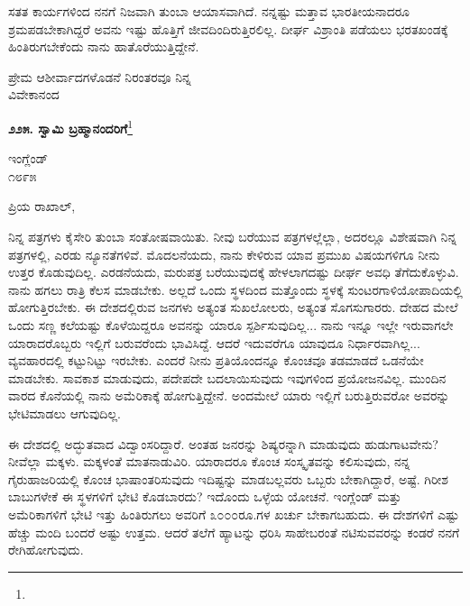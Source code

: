 \eject

ಸತತ ಕಾರ್ಯಗಳಿಂದ ನನಗೆ ನಿಜವಾಗಿ ತುಂಬಾ ಆಯಾಸವಾಗಿದೆ. ನನ್ನಷ್ಟು ಮತ್ತಾವ ಭಾರತೀಯನಾದರೂ ಶ್ರಮಪಡಬೇಕಾಗಿದ್ದರೆ ಅವನು ಇಷ್ಟು ಹೊತ್ತಿಗೆ ಜೀವದಿಂದಿರುತ್ತಿರಲಿಲ್ಲ. ದೀರ್ಘ ವಿಶ್ರಾಂತಿ ಪಡೆಯಲು ಭರತಖಂಡಕ್ಕೆ ಹಿಂತಿರುಗಬೇಕೆಂದು ನಾನು ಹಾತೊರೆಯುತ್ತಿದ್ದೇನೆ.


\vspace{-0.3cm}

{\flushright
ಪ್ರೇಮ ಆಶೀರ್ವಾದಗಳೊಡನೆ ನಿರಂತರವೂ ನಿನ್ನ\\ವಿವೇಕಾನಂದ\par}

\begin{center}
\textbf{೨೨೫. ಸ್ವಾಮಿ ಬ್ರಹ್ಮಾನಂದರಿಗೆ}\footnote{}
\end{center}

\vspace{-0.3cm}

\begin{flushright}
ಇಂಗ್ಲೆಂಡ್\\೧೮೯೫
\end{flushright}

\vspace{-0.2cm}

\vspace{0.1cm}

\noindent
ಪ್ರಿಯ ರಾಖಾಲ್,

\vspace{0.18cm}

ನಿನ್ನ ಪತ್ರಗಳು ಕೈಸೇರಿ ತುಂಬಾ ಸಂತೋಷವಾಯಿತು. ನೀವು ಬರೆಯುವ ಪತ್ರಗಳಲ್ಲೆಲ್ಲಾ, ಅದರಲ್ಲೂ ವಿಶೇಷವಾಗಿ ನಿನ್ನ ಪತ್ರಗಳಲ್ಲಿ, ಎರಡು ನ್ಯೂನತೆಗಳಿವೆ. ಮೊದಲನೆಯದು, ನಾನು ಕೇಳಿರುವ ಯಾವ ಪ್ರಮುಖ ವಿಷಯಗಳಿಗೂ ನೀನು ಉತ್ತರ ಕೊಡುವುದಿಲ್ಲ. ಎರಡನೆಯದು, ಮರುಪತ್ರ ಬರೆಯುವುದಕ್ಕೆ ಹೇಳಲಾಗದಷ್ಟು ದೀರ್ಘ ಅವಧಿ ತೆಗೆದುಕೊಳ್ಳುವಿ. ನಾನು ಹಗಲು ರಾತ್ರಿ ಕೆಲಸ ಮಾಡಬೇಕು. ಅಲ್ಲದೆ ಒಂದು ಸ್ಥಳದಿಂದ ಮತ್ತೊಂದು ಸ್ಥಳಕ್ಕೆ ಸುಂಟರಗಾಳಿಯೋಪಾದಿಯಲ್ಲಿ ಹೋಗುತ್ತಿರಬೇಕು. ಈ ದೇಶದಲ್ಲಿರುವ ಜನಗಳು ಅತ್ಯಂತ ಸುಖಲೋಲರು, ಅತ್ಯಂತ ಸೊಗಸುಗಾರರು. ದೇಹದ ಮೇಲೆ ಒಂದು ಸಣ್ಣ ಕಲೆಯಷ್ಟು ಕೊಳೆಯಿದ್ದರೂ ಅವನನ್ನು ಯಾರೂ ಸ್ಪರ್ಶಿಸುವುದಿಲ್ಲ... ನಾನು ಇನ್ನೂ ಇಲ್ಲೇ ಇರುವಾಗಲೇ ಯಾರಾದರೊಬ್ಬರು ಇಲ್ಲಿಗೆ ಬರುವರೆಂದು ಭಾವಿಸಿದ್ದೆ. ಆದರೆ ಇದುವರೆಗೂ ಯಾವುದೂ ನಿರ್ಧಾರವಾಗಿಲ್ಲ... ವ್ಯವಹಾರದಲ್ಲಿ ಕಟ್ಟುನಿಟ್ಟು ಇರಬೇಕು. ಎಂದರೆ ನೀನು ಪ್ರತಿಯೊಂದನ್ನೂ ಕೊಂಚವೂ ತಡಮಾಡದೆ ಒಡನೆಯೇ ಮಾಡಬೇಕು. ಸಾವಕಾಶ ಮಾಡುವುದು, ಪದೇಪದೇ ಬದಲಾಯಿಸುವುದು ಇವುಗಳಿಂದ ಪ್ರಯೋಜನವಿಲ್ಲ. ಮುಂದಿನ ವಾರದ ಕೊನೆಯಲ್ಲಿ ನಾನು ಅಮೆರಿಕಾಕ್ಕೆ ಹೋಗುತ್ತಿದ್ದೇನೆ. ಅಂದಮೇಲೆ ಯಾರು ಇಲ್ಲಿಗೆ ಬರುತ್ತಿರುವರೋ ಅವರನ್ನು ಭೇಟಿಮಾಡಲು ಆಗುವುದಿಲ್ಲ.

\vspace{0.18cm}

ಈ ದೇಶದಲ್ಲಿ ಅದ್ಭುತವಾದ ವಿದ್ವಾಂಸರಿದ್ದಾರೆ. ಅಂತಹ ಜನರನ್ನು ಶಿಷ್ಯರನ್ನಾಗಿ ಮಾಡುವುದು ಹುಡುಗಾಟವೇನು? ನೀವೆಲ್ಲಾ ಮಕ್ಕಳು. ಮಕ್ಕಳಂತೆ ಮಾತನಾಡುವಿರಿ. ಯಾರಾದರೂ ಕೊಂಚ ಸಂಸ್ಕೃತವನ್ನು ಕಲಿಸುವುದು, ನನ್ನ ಗೈರುಹಾಜರಿಯಲ್ಲಿ ಕೊಂಚ ಭಾಷಾಂತರಿಸುವುದು ಇದಿಷ್ಟನ್ನು ಮಾಡಬಲ್ಲವರು ಒಬ್ಬರು ಬೇಕಾಗಿದ್ದಾರೆ, ಅಷ್ಟೆ. ಗಿರೀಶ ಬಾಬುಗಳೇಕೆ ಈ ಸ್ಥಳಗಳಿಗೆ ಭೇಟಿ ಕೊಡಬಾರದು? ಇದೊಂದು ಒಳ್ಳೆಯ ಯೋಚನೆ. ಇಂಗ್ಲೆಂಡ್ ಮತ್ತು ಅಮೆರಿಕಾಗಳಿಗೆ ಭೇಟಿ ಇತ್ತು ಹಿಂತಿರುಗಲು ಅವರಿಗೆ ೩೦೦೦ರೂ.ಗಳ ಖರ್ಚು ಬೇಕಾಗಬಹುದು. ಈ ದೇಶಗಳಿಗೆ ಎಷ್ಟು ಹೆಚ್ಚು ಮಂದಿ ಬಂದರೆ ಅಷ್ಟು ಉತ್ತಮ. ಆದರೆ ತಲೆಗೆ ಹ್ಯಾಟನ್ನು ಧರಿಸಿ ಸಾಹೇಬರಂತೆ ನಟಿಸುವವರನ್ನು ಕಂಡರೆ ನನಗೆ ರೇಗಿಹೋಗುವುದು.

